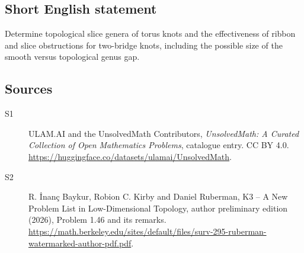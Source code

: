 \documentclass[11pt]{article}
\begin{document}
\subsection{Short English statement}
Determine topological slice genera of torus knots and the effectiveness of ribbon and slice obstructions for two-bridge knots, including the possible size of the smooth versus topological genus gap.
\subsection{Sources}
\begin{description}
\item[\hypertarget{source:statement:1}{S1}] ULAM.AI and the UnsolvedMath Contributors, \emph{UnsolvedMath: A Curated Collection of Open Mathematics Problems}, catalogue entry. CC BY 4.0. \url{https://huggingface.co/datasets/ulamai/UnsolvedMath}.
\item[\hypertarget{source:statement:2}{S2}] R. \.{I}nan\c{c} Baykur, Robion C. Kirby and Daniel Ruberman, K3 -- A New Problem List in Low-Dimensional Topology, author preliminary edition (2026), Problem 1.46 and its remarks. \url{https://math.berkeley.edu/sites/default/files/surv-295-ruberman-watermarked-author-pdf.pdf}.
\end{description}
\label{end:statement}
\end{document}
